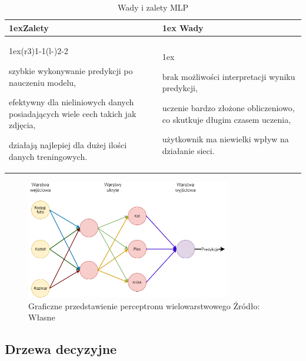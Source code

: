 \begin{table}[h]
    \begin{tabularx}{\linewidth}{>{\parskip1ex}X@{\kern4\tabcolsep}>{\parskip1ex}X}
    \toprule
    \hfil\bfseries Zalety
    &
    \hfil\bfseries Wady
    \\\cmidrule(r{3\tabcolsep}){1-1}\cmidrule(l{-\tabcolsep}){2-2}
    
    szybkie wykonywanie predykcji po nauczeniu modelu,\par
    efektywny dla nieliniowych danych posiadających wiele cech takich jak zdjęcia,\par
    działają najlepiej dla dużej ilości danych treningowych.\par
    &
    
    brak możliwości interpretacji wyniku predykcji,\par
    uczenie bardzo złożone obliczeniowo, co skutkuje długim czasem uczenia,\par
    użytkownik ma niewielki wpływ na działanie sieci.\par
    \\\bottomrule
    \end{tabularx}
    \caption{Wady i zalety MLP}
\end{table}

\begin{figure}[H]
    \centering
    \includegraphics[width=0.8\textwidth]{./Img/MLP.png}
    \caption{Graficzne przedstawienie perceptronu wielowarstwowego Źródło: Własne}
\end{figure}

\subsection{Drzewa decyzyjne}

